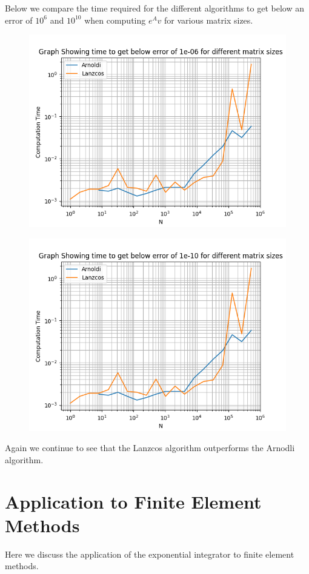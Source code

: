 \documentclass{article}
\begin{document}
Below we compare the time required for the different algorithms to get below an error of $10^6$ and $10^{10}$ when computing $e^Av$ for various matrix sizes.
\begin{figure}[H]
\includegraphics[width=\linewidth]{Plots/time to get below an error of 1e-06.png}
\end{figure}
\begin{figure}[H]
\includegraphics[width=\linewidth]{Plots/time to get below an error of 1e-10.png}
\end{figure}
Again we continue to see that the Lanzcos algorithm outperforms the Arnodli algorithm.

\section{Application to Finite Element Methods}
Here we discuss the application of the exponential integrator to finite element methods.
\end{document}
